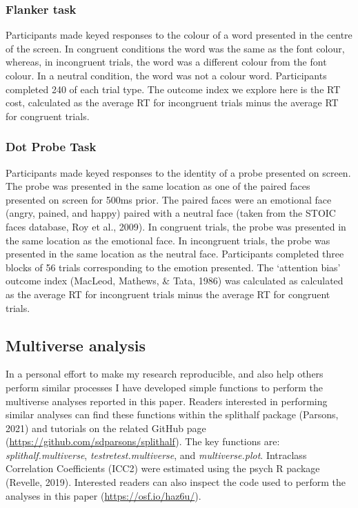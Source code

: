 \documentclass[
  man,floatsintext]{apa6}
\begin{document}
\hypertarget{flanker-task}{%
\subsubsection{Flanker task}\label{flanker-task}}

Participants made keyed responses to the colour of a word presented in the centre of the screen. In congruent conditions the word was the same as the font colour, whereas, in incongruent trials, the word was a different colour from the font colour. In a neutral condition, the word was not a colour word. Participants completed 240 of each trial type. The outcome index we explore here is the RT cost, calculated as the average RT for incongruent trials minus the average RT for congruent trials.

\hypertarget{dot-probe-task}{%
\subsubsection{Dot Probe Task}\label{dot-probe-task}}

Participants made keyed responses to the identity of a probe presented on screen. The probe was presented in the same location as one of the paired faces presented on screen for 500ms prior. The paired faces were an emotional face (angry, pained, and happy) paired with a neutral face (taken from the STOIC faces database, Roy et al., 2009). In congruent trials, the probe was presented in the same location as the emotional face. In incongruent trials, the probe was presented in the same location as the neutral face. Participants completed three blocks of 56 trials corresponding to the emotion presented. The `attention bias' outcome index (MacLeod, Mathews, \& Tata, 1986) was calculated as calculated as the average RT for incongruent trials minus the average RT for congruent trials.

\hypertarget{multiverse-analysis}{%
\subsection{Multiverse analysis}\label{multiverse-analysis}}

In a personal effort to make my research reproducible, and also help others perform similar processes I have developed simple functions to perform the multiverse analyses reported in this paper. Readers interested in performing similar analyses can find these functions within the splithalf package (Parsons, 2021) and tutorials on the related GitHub page (\url{https://github.com/sdparsons/splithalf}). The key functions are: \emph{splithalf.multiverse}, \emph{testretest.multiverse}, and \emph{multiverse.plot}. Intraclass Correlation Coefficients (ICC2) were estimated using the psych R package (Revelle, 2019). Interested readers can also inspect the code used to perform the analyses in this paper (\url{https://osf.io/haz6u/}).
\end{document}
